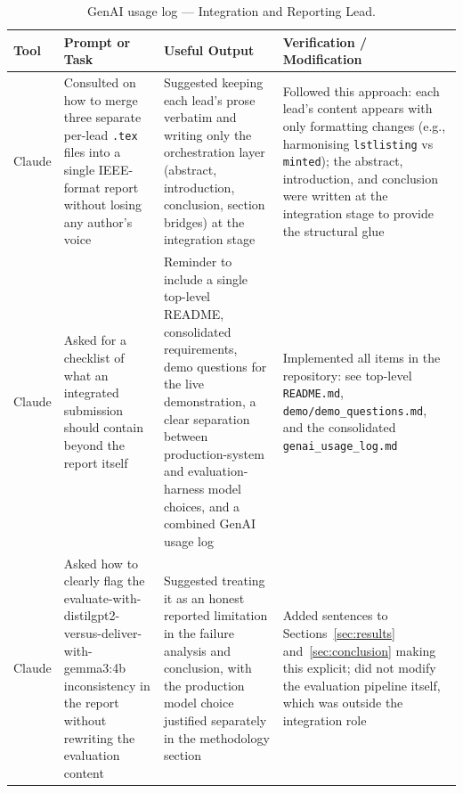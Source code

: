 \documentclass[10pt,conference]{IEEEtran}
\begin{document}
\begin{table}[h]
\centering
\caption{GenAI usage log --- Integration and Reporting Lead.}
\label{tab:genai-log-integration}
\begin{tabularx}{\textwidth}{p{1.5cm} p{3.5cm} p{3.5cm} X}
\toprule
Tool & Prompt or Task & Useful Output & Verification / Modification \\
\midrule
Claude & Consulted on how to merge three separate per-lead
\texttt{.tex} files into a single IEEE-format report without
losing any author's voice & Suggested keeping each lead's prose
verbatim and writing only the orchestration layer (abstract,
introduction, conclusion, section bridges) at the integration
stage & Followed this approach: each lead's content appears with
only formatting changes (e.g., harmonising \texttt{lstlisting} vs
\texttt{minted}); the abstract, introduction, and conclusion were
written at the integration stage to provide the structural glue \\
Claude & Asked for a checklist of what an integrated submission
should contain beyond the report itself & Reminder to include a
single top-level README, consolidated requirements, demo questions
for the live demonstration, a clear separation between
production-system and evaluation-harness model choices, and a
combined GenAI usage log & Implemented all items in the
repository: see top-level \texttt{README.md},
\texttt{demo/demo\_questions.md}, and the consolidated
\texttt{genai\_usage\_log.md} \\
Claude & Asked how to clearly flag the
evaluate-with-distilgpt2-versus-deliver-with-gemma3:4b
inconsistency in the report without rewriting the evaluation
content & Suggested treating it as an honest reported limitation
in the failure analysis and conclusion, with the production model
choice justified separately in the methodology section & Added
sentences to Sections~\ref{sec:results} and~\ref{sec:conclusion}
making this explicit; did not modify the evaluation pipeline
itself, which was outside the integration role \\
\bottomrule
\end{tabularx}
\end{table}
\end{document}

